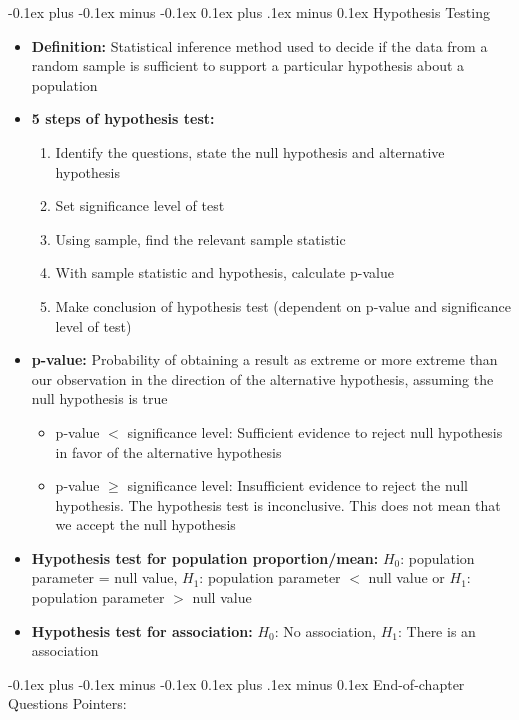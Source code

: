 \documentclass[landscape]{article}
\makeatletter
\renewcommand{\section}{\@startsection{section}{1}{0mm}%
  {-0.1ex plus -0.1ex minus -0.1ex}%
  {0.1ex plus .1ex minus 0.1ex}%
{\normalfont\small\bfseries}}
\renewcommand{\subsection}{\@startsection{subsection}{2}{0mm}%
  {-0.1ex plus -0.1ex minus -0.1ex}%
  {0.1ex plus .1ex minus 0.1ex}%
{\normalfont\scriptsize\bfseries}}
\makeatother
\begin{document}
\begin{multicols*}{5}
    \subsection{Hypothesis Testing}
    \begin{itemize}
      \item \textbf{Definition:} Statistical inference method used to decide if the data from a random sample is sufficient to support a particular hypothesis about a population
      \item \textbf{5 steps of hypothesis test:}
      \begin{enumerate}
        \item Identify the questions, state the null hypothesis and alternative hypothesis
        \item Set significance level of test
        \item Using sample, find the relevant sample statistic
        \item With sample statistic and hypothesis, calculate p-value
        \item Make conclusion of hypothesis test (dependent on p-value and significance level of test)
      \end{enumerate}
      \item \textbf{p-value:} Probability of obtaining a result as extreme or more extreme than our observation in the direction of the alternative hypothesis, assuming the null hypothesis is true
      \begin{itemize}
        \item p-value $<$ significance level: Sufficient evidence to reject null hypothesis in favor of the alternative hypothesis
        \item p-value $\geq$ significance level: Insufficient evidence to reject the null hypothesis. The hypothesis test is inconclusive. This does not mean that we accept the null hypothesis
      \end{itemize}
      \item \textbf{Hypothesis test for population proportion/mean:} $H_0$: population parameter = null value, $H_1$: population parameter $<$ null value or $H_1$: population parameter $>$ null value
      \item \textbf{Hypothesis test for association:} $H_0$: No association, $H_1$: There is an association
    \end{itemize}

    \section{End-of-chapter Questions Pointers:}

\end{multicols*}
\end{document}
